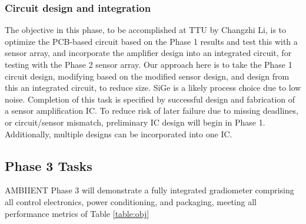\subsubsection{Circuit design and integration}\label{sec:p2:cir}

The objective in this phase, to be accomplished at TTU by Changzhi Li, is to optimize the PCB-based circuit based on the Phase 1 results and test this with a sensor array, and incorporate the amplifier design into an integrated circuit, for testing with the Phase 2 sensor array. Our approach here is to take the Phase 1 circuit design, modifying based on the modified sensor design, and design from this an integrated circuit, to reduce size. SiGe is a likely process choice due to low noise. Completion of this task is specified by successful design and fabrication of a sensor amplification IC. To reduce risk of later failure due to missing deadlines, or circuit/sensor mismatch, preliminary IC design will begin in Phase 1. Additionally, multiple designs can be incorporated into one IC.

\subsection{Phase 3 Tasks}
AMBIIENT Phase 3 will demonstrate a fully integrated gradiometer comprising all control
electronics, power conditioning, and packaging, meeting all performance metrics of Table  \ref{table:obj}

